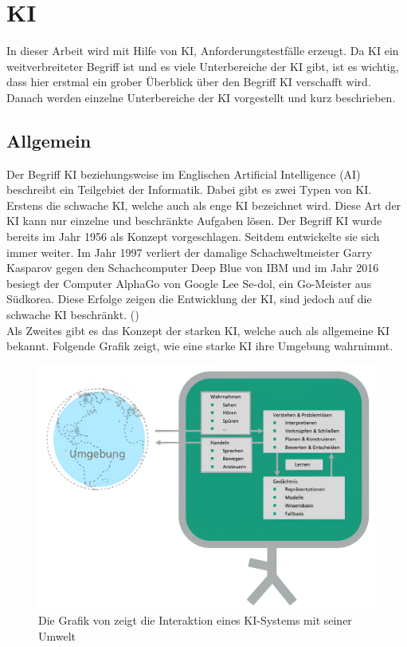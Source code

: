 \documentclass[12pt,toc=bib,toc=listof]{scrreprt}
\begin{document}
\section{KI} %
\label{sec:KI}
In dieser Arbeit wird mit Hilfe von KI, Anforderungstestfälle erzeugt. Da KI ein weitverbreiteter Begriff ist und es viele Unterbereiche der KI gibt, ist es wichtig, dass hier erstmal ein grober Überblick über den Begriff KI verschafft wird. Danach werden einzelne Unterbereiche der KI vorgestellt und kurz beschrieben.

\subsection{Allgemein} %
\label{sec:allgemein}
Der Begriff KI beziehungsweise im Englischen Artificial Intelligence (AI) beschreibt ein Teilgebiet der Informatik. Dabei gibt es zwei Typen von KI. Erstens die schwache KI, welche auch als enge KI bezeichnet wird. Diese Art der KI kann nur einzelne und beschränkte Aufgaben lösen. Der Begriff KI wurde bereits im Jahr 1956 als Konzept vorgeschlagen. Seitdem entwickelte sie sich immer weiter. Im Jahr 1997 verliert der damalige Schachweltmeister Garry Kasparov gegen den Schachcomputer Deep Blue von IBM und im Jahr 2016 besiegt der Computer AlphaGo von Google Lee Se-dol, ein Go-Meister aus Südkorea. Diese Erfolge zeigen die Entwicklung der KI, sind jedoch auf die schwache KI beschränkt. (\cite{Hecker2018})\\
\newpage
\noindent Als Zweites gibt es das Konzept der starken KI, welche auch als allgemeine KI bekannt. Folgende Grafik zeigt, wie eine starke KI ihre Umgebung wahrnimmt.
\begin{figure} [H]
    \centering
    \includegraphics[width=0.75\linewidth]{./Bilder/Fraunhofer_KI-Umgebung.png}
    \caption{Die Grafik von \textcite{Hecker2018} zeigt die Interaktion eines KI-Systems mit seiner Umwelt}
    \label{fig:enter-label}
\end{figure}
\end{document}

